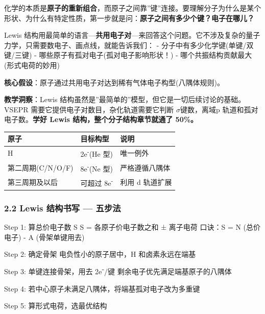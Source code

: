 \documentclass[a4paper,11pt]{ctexart}
\newenvironment{Shaded}{}{}
\newenvironment{Highlighting}{}{}
\newcommand{\NormalTok}[1]{#1}
\newcounter{none}
\newcommand{\箭}{\ensuremath{\rightarrow}}
\newcommand{\左箭}{\ensuremath{\leftarrow}}
\newcommand{\上箭}{\ensuremath{\uparrow}}
\newcommand{\下箭}{\ensuremath{\downarrow}}
\newcommand{\衡}{\ensuremath{\rightleftharpoons}}
\newcommand{\双箭}{\ensuremath{\leftrightarrow}}
\newcommand{\约等于}{\ensuremath{\approx}}
\newcommand{\小于等于}{\ensuremath{\leq}}
\newcommand{\大于等于}{\ensuremath{\geq}}
\newcommand{\不等于}{\ensuremath{\neq}}
\newcommand{\西格马}{\ensuremath{\sigma}}
\newcommand{\派}{\ensuremath{\pi}}
\begin{document}
化学的本质是\textbf{原子的重新组合}，而原子之间靠''键''连接。要理解分子为什么是某个形状、为什么有特定性质，第一步就是问：\textbf{原子之间有多少个键？电子在哪儿？}

Lewis 结构用最简单的语言---\textbf{共用电子对}---来回答这个问题。它不涉及复杂的量子力学，只需要数电子、画点线，就能告诉我们：
- 分子中有多少化学键(单键/双键/三键)
- 哪些原子有孤对电子(孤对电子影响形状！)
- 哪个共振结构贡献最大(形式电荷的妙用)

\textbf{核心假设}：原子通过共用电子对达到稀有气体电子构型(八隅体规则)。

\textbf{教学洞察}：Lewis 结构虽然是''最简单的''模型，但它是一切后续讨论的基础。VSEPR 需要它提供电子对数目，杂化轨道需要它判断 \西格马 键数，离域 p 轨道和孤对电子数。\textbf{学好 Lewis 结构，整个分子结构章节就通了 50\%。}

{\def\LTcaptype{none} %
\begin{longtable}[]{@{}lll@{}}
\toprule\noalign{}
原子 & 目标构型 & 说明 \\
\midrule\noalign{}
\endhead
\bottomrule\noalign{}
\endlastfoot
H & 2e\textsuperscript{-}(He 型) & 唯一例外 \\
第二周期(C/N/O/F) & 8e\textsuperscript{-}(Ne 型) & 严格遵循八隅体 \\
第三周期及以后 & 可超过 8e\textsuperscript{-} & 利用 d 轨道扩展 \\
\end{longtable}
}

\subsubsection{2.2 Lewis 结构书写 --- 五步法}\label{lewis-ux7ed3ux6784ux4e66ux5199-ux4e94ux6b65ux6cd5}

\begin{Shaded}
\begin{Highlighting}[]
\NormalTok{Step 1: 算总价电子数 S}
\NormalTok{  S = 各原子价电子数之和 ± 离子电荷}
\NormalTok{  口诀：S = N (总价电子) {-} A (骨架单键用去)}

\NormalTok{Step 2: 确定骨架}
\NormalTok{  电负性小的原子居中，H 和卤素永远在端基}

\NormalTok{Step 3: 单键连接骨架，用去 2e⁻/键}
\NormalTok{  剩余电子优先满足端基原子的八隅体}

\NormalTok{Step 4: 若中心原子未满足八隅体，将端基孤对电子改为多重键}

\NormalTok{Step 5: 算形式电荷，选最优结构}
\end{Highlighting}
\end{Shaded}
\end{document}
